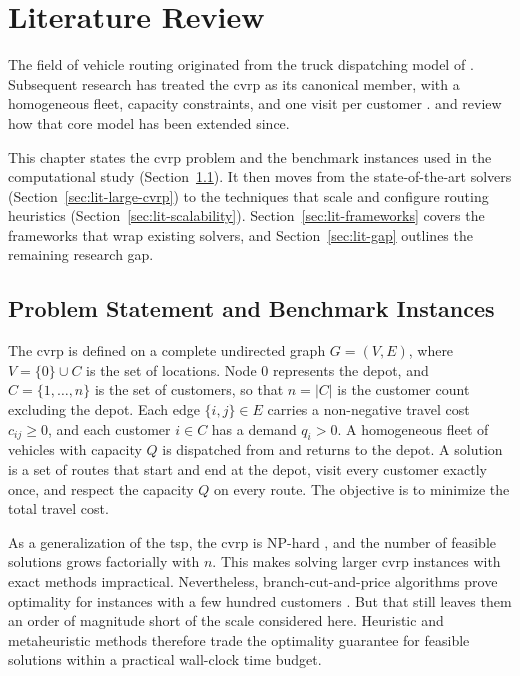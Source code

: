 \chapter{Literature Review}\label{chapter:literature}

The field of vehicle routing originated from the truck dispatching model of \citet{truck_dantzig_1959}. Subsequent research has treated the \gls{cvrp} as its canonical member, with a homogeneous fleet, capacity constraints, and one visit per customer \citep[p.~3]{tothVehicleRouting2014}. \citet{vidalConciseGuideExisting2020} and \citet{archetti2026beyond} review how that core model has been extended since.

This chapter states the \gls{cvrp} problem and the benchmark instances used in the computational study (Section~\ref{sec:lit-problem}). It then moves from the state-of-the-art solvers (Section~\ref{sec:lit-large-cvrp}) to the techniques that scale and configure routing heuristics (Section~\ref{sec:lit-scalability}). Section~\ref{sec:lit-frameworks} covers the frameworks that wrap existing solvers, and Section~\ref{sec:lit-gap} outlines the remaining research gap.

\section{Problem Statement and Benchmark Instances}\label{sec:lit-problem}\label{chapter:problem}

The \gls{cvrp} is defined on a complete undirected graph $G = (V, E)$, where $V = \{0\} \cup C$ is the set of locations. Node $0$ represents the depot, and $C = \{1, \dots, n\}$ is the set of customers, so that $n = |C|$ is the customer count excluding the depot. Each edge $\{i, j\} \in E$ carries a non-negative travel cost $c_{ij} \geq 0$, and each customer $i \in C$ has a demand $q_i > 0$. A homogeneous fleet of vehicles with capacity $Q$ is dispatched from and returns to the depot. A solution is a set of routes that start and end at the depot, visit every customer exactly once, and respect the capacity $Q$ on every route. The objective is to minimize the total travel cost.

As a generalization of the \gls{tsp}, the \gls{cvrp} is NP-hard \citep{lenstraComplexityVehicleRouting1981}, and the number of feasible solutions grows factorially with $n$. This makes solving larger \gls{cvrp} instances with exact methods impractical. Nevertheless, branch-cut-and-price algorithms prove optimality for instances with a few hundred customers \citep{exact_costa_2019,improved_pecin_2017,generic_pessoa_2020}. But that still leaves them an order of magnitude short of the scale considered here. Heuristic and metaheuristic methods therefore trade the optimality guarantee for feasible solutions within a practical wall-clock time budget.


